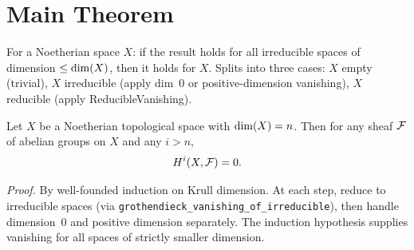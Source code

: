 \chapter{Main Theorem}\label{ch:main}

\begin{lemma}\label{lem:grothendieck_vanishing_of_irreducible}
  \leanok
  For a Noetherian space $X$: if the result holds for all irreducible spaces
  of dimension $\le \operatorname{dim}(X)$, then it holds for $X$.
  Splits into three cases: $X$ empty (trivial), $X$ irreducible (apply
  dim~0 or positive-dimension vanishing), $X$ reducible (apply ReducibleVanishing).
\end{lemma}

\begin{theorem}\label{thm:GrothendieckVanishing}
  \leanok
  Let $X$ be a Noetherian topological space with $\operatorname{dim}(X) = n$.
  Then for any sheaf $\mathcal{F}$ of abelian groups on $X$ and any $i > n$,
  \[
    H^i(X, \mathcal{F}) = 0.
  \]

  \emph{Proof.} By well-founded induction on Krull dimension.
  At each step, reduce to irreducible spaces
  (via \texttt{grothendieck\_vanishing\_of\_irreducible}), then handle
  dimension~0 and positive dimension separately. The induction hypothesis
  supplies vanishing for all spaces of strictly smaller dimension.
\end{theorem}
